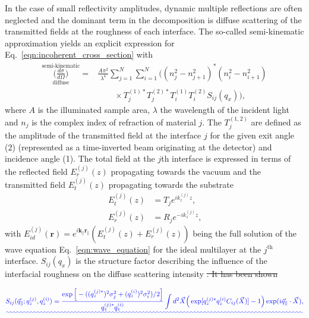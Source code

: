 \documentclass[twocolumn,osajnl,showpacs,superscriptaddress,11pt]{revtex4-1}
\providecommand{\DIFadd}[1]{{\protect\color{blue}\uwave{#1}}} %
\providecommand{\DIFdel}[1]{{\protect\color{red}\sout{#1}}}                      %
\providecommand{\DIFaddbegin}{} %
\providecommand{\DIFdelbegin}{} %
\providecommand{\DIFdelend}{} %
\begin{document}
In the case of small reflectivity amplitudes, dynamic multiple reflections are often neglected and the dominant term in the decomposition is diffuse scattering of the transmitted fields at the roughness of each interface. The so-called semi-kinematic approximation \cite{PhysRevB.38.2297} yields an explicit expression for Eq.~\eqref{eqn:incoherent_cross_section} with
\begin{align}
                \overset{\text{semi-kinematic}}{\underset{\text{diffuse}}{\Big(\frac{d \sigma}{d \Omega}\Big)}} = &\frac{A \pi^2}{\lambda^4}\sum \limits_{j=1}^{N}\sum \limits_{i=1}^{N} \Big((n_j^2 - n_{j+1}^2)^* (n_i^2 - n_{i+1}^2) \nonumber \\ &\qquad\times T^{(1)*}_j T^{(2)*}_j T^{(1)}_i T^{(2)}_i S_{i j}(q_x)\Big)\text{,} \label{eqn:semi_kinematic_theory} 
\end{align}
where $A$ is the illuminated sample area, $\lambda$ the wavelength of the incident light and $n_j$ is the complex index of refraction of material $j$. The $T^{(1,2)}_j$ are defined as the amplitude of the transmitted field at the interface $j$ for the given exit angle (2) (represented as a time-inverted beam originating at the detector) and incidence angle (1). The total field at the $j$th interface is expressed in terms of the reflected field $E_r^{(j)}(z)$ propagating towards the vacuum and the transmitted field $E_t^{(j)}(z)$ propagating towards the substrate
\begin{align}
	E_t^{(j)}(z) &= T_{j} e^{i k_z^{(j)} z} \text{,} \\
	E_r^{(j)}(z) &= R_{j} e^{-i k_z^{(j)} z} \text{,} 
\end{align}
with $E_{id}^{(j)}(\mathbf{r}) = e^{i \mathbf{k_\parallel r_\parallel}} (E_t^{(j)}(z) + E_r^{(j)}(z))$ being the full solution of the wave equation Eq.~\eqref{eqn:wave_equation} for the ideal multilayer at the $j^\text{th}$ interface. $S_{ij}(q_x)$ is the structure factor describing the influence of the interfacial roughness on the diffuse scattering intensity \DIFdelbegin \DIFdel{. It has been shown }\DIFdelend \DIFaddbegin \DIFadd{defined through
}\begin{widetext}
\begin{align}
\DIFadd{S_{ij}(\vec{q}_\parallel; q_z^{(j)}, q_z^{(i)}) = \frac{\exp \Big[-((q_z^{(j)*})^{2} \sigma_j^2 + (q_z^{(i)})^{2} \sigma_i^2)/2\Big]}{q_z^{(j)*} q_z^{(i)}} \int d^2 \vec{X} \Big(\exp [q_z^{(j)*} q_z^{(i)} C_{ij}(\vec{X})]-1\Big) \exp(i \vec{q}_\parallel \cdot \vec{X}) \text{,} }\label{eqn:full_structure_factor}
\end{align}
\end{widetext}
\end{document}
